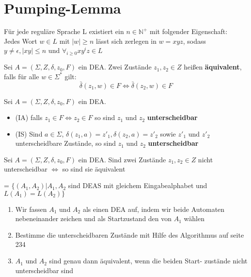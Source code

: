 \documentclass[14pt]{article}
\begin{document}
\section{Pumping-Lemma}
\begin{eigenschaft}
    Für jede reguläre Sprache L existiert ein $n \in \mathbb{N}^+$ mit folgender
    Eigenschaft: \\
    Jedes Wort $w \in L$ mit $|w| \geq n$ lässt sich zerlegen in $w = xyz$, sodass
    $y \neq \epsilon, |xy| \leq n$ und $\forall_{i \geq 0} xy^iz \in L$
\end{eigenschaft}
\begin{definition}
    Sei $A = (\varSigma, Z, \delta, z_0, F)$ ein DEA. Zwei Zustände $z_1, z_2 \in Z$
    heißen \textbf{äquivalent}, falls für alle $w \in \varSigma^*$ gilt:
    \[
        \bar{\delta}(z_1, w) \in F \Leftrightarrow \bar{\delta}(z_2, w) \in F   
    \]
\end{definition}
\begin{definition}
    Sei $A = (\varSigma, Z, \delta, z_0, F)$ ein DEA.
    \begin{itemize}
        \item (IA) falls $z_1 \in F \Leftrightarrow z_2 \in F$ so sind $z_1$ und $z_2$
        \textbf{unterscheidbar}
        \item (IS) Sind $a \in \varSigma$, $\delta(z_1, a) = z'_1, \delta(z_2, a) = z'_2$
        sowie $z'_1$ und $z'_2$ unterscheidbare Zustände, so sind $z_1$ und $z_2$ 
        \textbf{unterscheidbar}
    \end{itemize}
\end{definition}
\begin{eigenschaft}
    Sei $A = (\varSigma, Z, \delta, z_0, F)$ ein DEA. 
    Sind zwei Zustände $z_1, z_2 \in Z$ nicht unterscheidbar $\Leftrightarrow$ so sind sie äquivalent
\end{eigenschaft}
\begin{definition}
     = $\{(A_1, A_2) | A_1, A_2$ sind DEAS mit gleichem
    Eingabealphabet und $L(A_1) = L(A_2)\}$
\end{definition}
\begin{enumerate}
    \item Wir fassen $A_1$ und $A_2$ als einen DEA auf, indem wir beide
    Automaten nebeneinander zeichen und als Startzustand den von $A_1$ wählen
    \item Bestimme die unterscheidbaren Zustände mit Hilfe des Algorithmus 
    auf seite 234
    \item $A_1$ und $A_2$ sind genau dann äquivalent, wenn die beiden Start-
    zustände nicht unterscheidbar sind
\end{enumerate}
\end{document}
